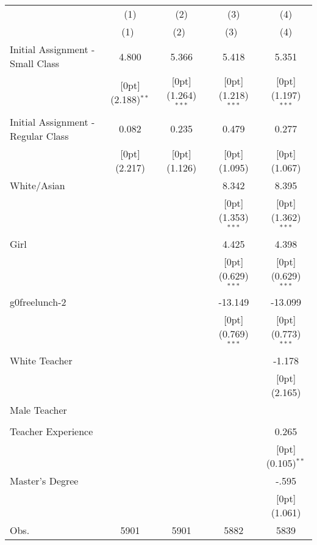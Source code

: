 \begin{tabular*}{\textwidth}{@{\extracolsep{\fill}}lcccc}				
	& \multicolumn{1}{c}{(1)} &	\multicolumn{1}{c}{(2)} &	\multicolumn{1}{c}{(3)} &	\multicolumn{1}{c}{(4)} \\
\cline{2-5}				
	& \multicolumn{1}{c}{(1)\mbox{\ }} &	\multicolumn{1}{c}{(2)\mbox{\ }} &	\multicolumn{1}{c}{(3)\mbox{\ }} &	\multicolumn{1}{c}{(4)} \\
\hline				
Initial Assignment - Small Class &	4.800 &	5.366 &	5.418 &	5.351 \\
&	\raisebox{.7ex}[0pt]{\scriptsize (2.188)$^{**}$} &	\raisebox{.7ex}[0pt]{\scriptsize (1.264)$^{***}$} &	\raisebox{.7ex}[0pt]{\scriptsize (1.218)$^{***}$} &	\raisebox{.7ex}[0pt]{\scriptsize (1.197)$^{***}$} \\
Initial Assignment - Regular Class &	0.082 &	0.235 &	0.479 &	0.277 \\
&	\raisebox{.7ex}[0pt]{\scriptsize (2.217)} &	\raisebox{.7ex}[0pt]{\scriptsize (1.126)} &	\raisebox{.7ex}[0pt]{\scriptsize (1.095)} &	\raisebox{.7ex}[0pt]{\scriptsize (1.067)} \\
White/Asian &	&	&	8.342 &	8.395 \\
&	&	&	\raisebox{.7ex}[0pt]{\scriptsize (1.353)$^{***}$} &	\raisebox{.7ex}[0pt]{\scriptsize (1.362)$^{***}$} \\
Girl &	&	&	4.425 &	4.398 \\
&	&	&	\raisebox{.7ex}[0pt]{\scriptsize (0.629)$^{***}$} &	\raisebox{.7ex}[0pt]{\scriptsize (0.629)$^{***}$} \\
g0freelunch-2 &	&	&	-13.149 &	-13.099 \\
&	&	&	\raisebox{.7ex}[0pt]{\scriptsize (0.769)$^{***}$} &	\raisebox{.7ex}[0pt]{\scriptsize (0.773)$^{***}$} \\
White Teacher &	&	&	&	-1.178 \\
&	&	&	&	\raisebox{.7ex}[0pt]{\scriptsize (2.165)} \\
Male Teacher &	&	&	&	\\
&	&	&	&	\\
Teacher Experience &	&	&	&	0.265 \\
&	&	&	&	\raisebox{.7ex}[0pt]{\scriptsize (0.105)$^{**}$} \\
Master's Degree &	&	&	&	-.595 \\
&	&	&	&	\raisebox{.7ex}[0pt]{\scriptsize (1.061)} \\
Obs. &	5901 &	5901 &	5882 &	5839 \\
\hline\hline				
\end{tabular*}%
